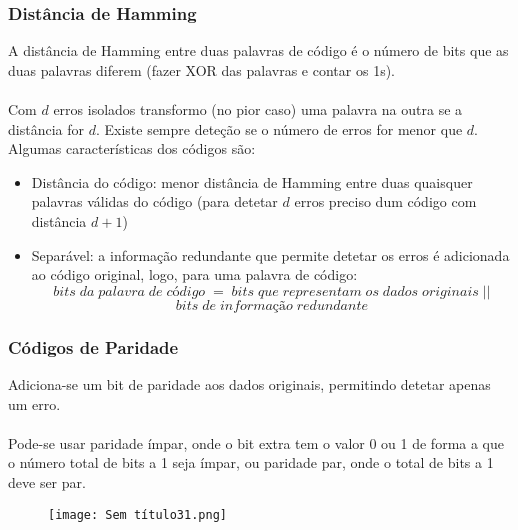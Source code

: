 \documentclass[10pt,a4paper]{report}
\begin{document}
\subsubsection{Distância de Hamming}
A distância de Hamming entre duas palavras de código é o número de bits que as duas palavras diferem (fazer XOR das palavras e contar os 1s).\\
\\
Com $d$ erros isolados transformo (no pior caso) uma palavra na outra se a distância for $d$. Existe sempre deteção se o número de erros for menor que $d$. Algumas características dos códigos são:
\begin{itemize}
\item Distância do código: menor distância de Hamming entre duas quaisquer palavras válidas do código (para detetar $d$ erros preciso dum código com distância $d+1$)
\item Separável: a informação redundante que permite detetar os erros é adicionada ao código original, logo, para uma palavra de código:
$$
bits\;da\;palavra\;de\;código\;=\;bits\;que\;representam\;os\;dados\;originais\;||$$
$$bits\;de\;informação\;redundante
$$
\end{itemize}
\subsubsection{Códigos de Paridade}
Adiciona-se um bit de paridade aos dados originais, permitindo detetar apenas um erro.\\
\\
Pode-se usar paridade ímpar, onde o bit extra tem o valor 0 ou 1 de forma a que o número total de bits a 1 seja ímpar, ou paridade par, onde o total de bits a 1 deve ser par.
\begin{figure}[H]
\centering
\texttt{[image: Sem título31.png]}
\end{figure}
\end{document}

